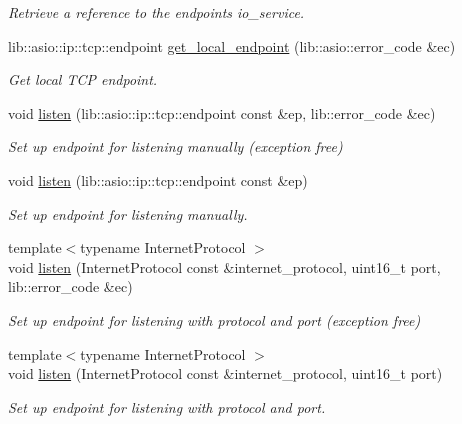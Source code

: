 \begin{DoxyCompactItemize}
\begin{DoxyCompactList}\small\item\em Retrieve a reference to the endpoint\textquotesingle{}s io\+\_\+service. \end{DoxyCompactList}\item 
lib\+::asio\+::ip\+::tcp\+::endpoint \hyperlink{classwebsocketpp_1_1transport_1_1asio_1_1endpoint_a4147ba098fc2f1669d2f880b47917342}{get\+\_\+local\+\_\+endpoint} (lib\+::asio\+::error\+\_\+code \&ec)
\begin{DoxyCompactList}\small\item\em Get local T\+C\+P endpoint. \end{DoxyCompactList}\item 
void \hyperlink{classwebsocketpp_1_1transport_1_1asio_1_1endpoint_ac36c2b22a7c2550663792472a728f615}{listen} (lib\+::asio\+::ip\+::tcp\+::endpoint const \&ep, lib\+::error\+\_\+code \&ec)
\begin{DoxyCompactList}\small\item\em Set up endpoint for listening manually (exception free) \end{DoxyCompactList}\item 
void \hyperlink{classwebsocketpp_1_1transport_1_1asio_1_1endpoint_ab3d7708b939531c5c803e3b148a9b009}{listen} (lib\+::asio\+::ip\+::tcp\+::endpoint const \&ep)
\begin{DoxyCompactList}\small\item\em Set up endpoint for listening manually. \end{DoxyCompactList}\item 
{\footnotesize template$<$typename Internet\+Protocol $>$ }\\void \hyperlink{classwebsocketpp_1_1transport_1_1asio_1_1endpoint_ae6813b9ecda67a13a78967f72e77b061}{listen} (Internet\+Protocol const \&internet\+\_\+protocol, uint16\+\_\+t port, lib\+::error\+\_\+code \&ec)
\begin{DoxyCompactList}\small\item\em Set up endpoint for listening with protocol and port (exception free) \end{DoxyCompactList}\item 
{\footnotesize template$<$typename Internet\+Protocol $>$ }\\void \hyperlink{classwebsocketpp_1_1transport_1_1asio_1_1endpoint_ad08b16daae1fac46679245ec7d0c8952}{listen} (Internet\+Protocol const \&internet\+\_\+protocol, uint16\+\_\+t port)
\begin{DoxyCompactList}\small\item\em Set up endpoint for listening with protocol and port. \end{DoxyCompactList}\item 

\end{DoxyCompactItemize}
